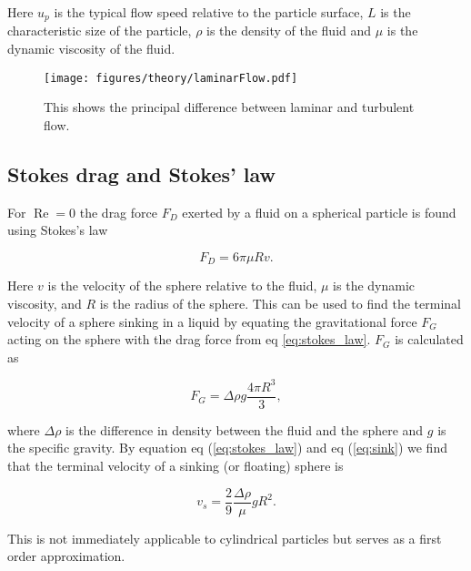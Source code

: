 \noindent Here $u_p$ is the typical flow speed relative to the particle surface, $L$ is the characteristic size of the particle, $\rho$ is the density of the fluid and $\mu$ is the dynamic viscosity of the fluid. 

\begin{figure}[H]
\centering
\texttt{[image: figures/theory/laminarFlow.pdf]}
\caption{This shows the principal difference between laminar and turbulent flow.}
\label{fig:laminar_flow}
\end{figure}

\subsection{Stokes drag and Stokes' law}
For $\operatorname{Re} = 0$ the drag force $F_D$ exerted by a fluid on a spherical particle is found using Stokes's law \cite{introfluid2}

\begin{equation}\label{eq:stokes_law}
F_D = 6\pi \mu R v.
\end{equation}

\noindent Here $v$ is the velocity of the sphere relative to the fluid, $\mu$ is the dynamic viscosity, and $R$ is the radius of the sphere. This can be used to find the terminal velocity of a sphere sinking in a liquid by equating the gravitational force $F_G$ acting on the sphere with the drag force from eq \ref{eq:stokes_law}. $F_G$ is calculated as

\begin{equation}\label{eq:sink}
F_G = \Delta \rho g \frac{4\pi R^3}{3},
\end{equation}

\noindent where $\Delta \rho$ is the difference in density between the fluid and the sphere and $g$ is the specific gravity. By equation eq (\ref{eq:stokes_law}) and eq (\ref{eq:sink}) we find that the terminal velocity of a sinking (or floating) sphere is

\begin{equation}\label{eq:fallingSphere}
v_s = \frac{2}{9} \frac{\Delta \rho}{\mu} g R^2.
\end{equation}

\noindent This is not immediately applicable to cylindrical particles but serves as a first order approximation.